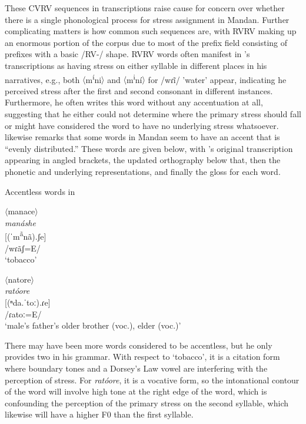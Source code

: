 These CVRV sequences in  transcriptions raise cause for concern over whether there is a single phonological process for stress assignment in Mandan. Further complicating matters is how common such sequences are, with RVRV making up an enormous portion of the corpus due to most of the prefix field consisting of prefixes with a basic /RV-/ shape. RVRV words often manifest in
\citeauthor{hollow1970}'s transcriptions as having stress on either syllable in different places in his narratives, e.g., both $\langle$m\textsuperscript{í}ni$\rangle$ and $\langle$m\textsuperscript{i}ní$\rangle$ for /wɾĩ/ 'water' appear, indicating he perceived stress after the first and second consonant in different instances. Furthermore, he often writes this word without any accentuation at all, suggesting that he either could not determine where the primary stress should fall or might have considered the word to have no underlying stress whatsoever. \citet[5]{kennard1936} likewise remarks that some words in Mandan seem to have an accent that is ``evenly distributed.'' These words are given below, with \citeauthor{kennard1936}'s original transcription appearing in angled brackets, the updated orthography below that, then the phonetic and underlying representations, and finally the gloss for each word.

\begin{exe}
\item\label{kennardaccentless} Accentless words in \citet{kennard1936}


\begin{xlist}
\item $\langle$manace$\rangle$\\
	\textit{manáshe}\\
 	{[}(ˈm\textsuperscript{ã}nã).ʃe]\\
	/wɾãʃ=E/\\
	`tobacco'

\item $\langle$natore$\rangle$\\
	\textit{ratóore}\\
	{[}(ⁿda.ˈtoː).ɾe]\\
	/ɾatoː=E/\\
	`male's father's older brother (voc.), elder (voc.)'

\end{xlist}

\end{exe}

There may have been more words \citet{kennard1936} considered to be accentless, but he only provides two in his grammar. With respect to `tobacco', it is a citation form where boundary tones and a Dorsey's Law vowel are interfering with the perception of stress. For \textit{ratóore}, it is a vocative form, so the intonational contour of the word will involve high tone at the right edge of the word, which is confounding the perception of the primary stress on the second syllable, which likewise will have a higher F0 than the first syllable.

